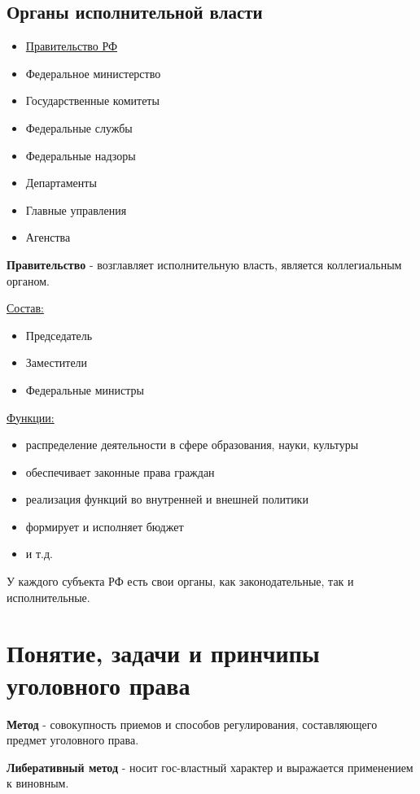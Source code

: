 \documentclass[a5paper,10pt]{article}
\begin{document}
		\subsection{Органы исполнительной власти}
			\begin{itemize}[itemsep=0pt]
				\item \underline{Правительство РФ}
				\item Федеральное министерство
				\item Государственные комитеты
				\item Федеральные службы
				\item Федеральные надзоры
				\item Департаменты
				\item Главные управления
				\item Агенства
			\end{itemize}

			\textbf{Правительство} - возглавляет исполнительную власть, является коллегиальным органом.
			
			\underline{Состав:}
			\begin{itemize}[itemsep=0pt]
				\item Председатель
				\item Заместители
				\item Федеральные министры
			\end{itemize}

			\underline{Функции:}
			\begin{itemize}[itemsep=0pt]
				\item распределение деятельности в сфере образования, науки, культуры
				\item обеспечивает законные права граждан
				\item реализация функций во внутренней и внешней политики
				\item формирует и исполняет бюджет
				\item и т.д.
			\end{itemize}

			У каждого субъекта РФ есть свои органы, как законодательные, так и исполнительные.

	\section{Понятие, задачи и принчипы уголовного права}
		\textbf{Метод} - совокупность приемов и способов регулирования, составляющего предмет уголовного права.

		\textbf{Либеративный метод} - носит гос-властный характер и выражается применением к виновным.
\end{document}
